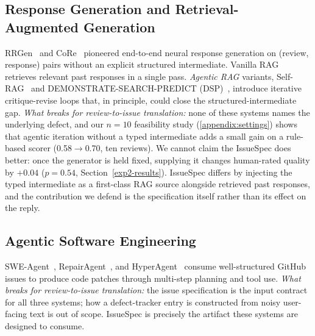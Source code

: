 \documentclass[preprint,12pt]{elsarticle}
\begin{document}
\subsection{Response Generation and Retrieval-Augmented Generation}
RRGen~\cite{gao2019automating} and CoRe~\cite{gao2021automating} pioneered end-to-end neural response generation on (review, response) pairs without an explicit structured intermediate. Vanilla RAG~\cite{lewis2020retrieval} retrieves relevant past responses in a single pass. \emph{Agentic RAG} variants, Self-RAG~\cite{asai2024self} and DEMONSTRATE-SEARCH-PREDICT (DSP)~\cite{khattab2022demonstrate}, introduce iterative critique-revise loops that, in principle, could close the structured-intermediate gap. \emph{What breaks for review-to-issue translation:} none of these systems names the underlying defect, and our $n=10$ feasibility study (\ref{appendix:settings}) shows that agentic iteration without a typed intermediate adds a small gain on a rule-based scorer (0.58$\to$0.70, ten reviews). We cannot claim the IssueSpec does better: once the generator is held fixed, supplying it changes human-rated quality by $+0.04$ ($p = 0.54$, Section~\ref{exp2-results}). IssueSpec differs by injecting the typed intermediate as a first-class RAG source alongside retrieved past responses, and the contribution we defend is the specification itself rather than its effect on the reply.

\subsection{Agentic Software Engineering}
SWE-Agent~\cite{yang2024swe}, RepairAgent~\cite{bouzenia2025repairagent}, and HyperAgent~\cite{phan2024hyperagent} consume well-structured GitHub issues to produce code patches through multi-step planning and tool use. \emph{What breaks for review-to-issue translation:} the issue specification is the input contract for all three systems; how a defect-tracker entry is constructed from noisy user-facing text is out of scope. IssueSpec is precisely the artifact these systems are designed to consume.
\end{document}
